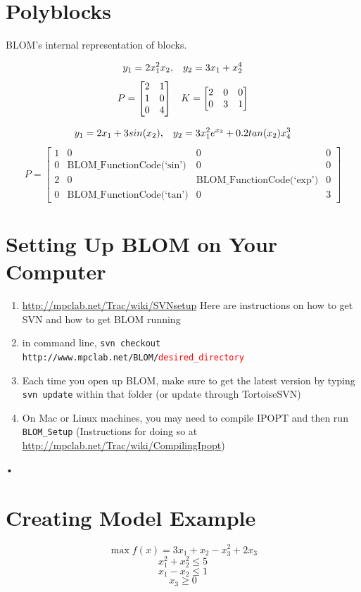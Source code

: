 \documentclass[12pt]{report}
\newcommand{\red}[1]{\textcolor{red}{#1}}
\begin{document}
\section{Polyblocks}
BLOM's internal representation of blocks.

$$ y_1=2x^2_1x_2 , \hspace{3mm} y_2=3x_1+x_2^4 $$
\[
P = \begin{bmatrix}
2 & 1 \\
1 & 0 \\
0 & 4
\end{bmatrix}
\hspace{3mm}
K = \begin{bmatrix}
2 & 0 & 0\\
0 & 3 & 1
\end{bmatrix}
\]

$$y_1 = 2x_1+3sin(x_2),  \hspace{3mm} y_2 = 3x_1^2e^{x_3}+0.2tan(x_2)x_4^3$$
\[P= \begin{bmatrix}
1 & 0 & 0 & 0 \\
0 & \text{BLOM\_FunctionCode(`sin')} & 0 & 0\\
2 & 0 & \text{BLOM\_FunctionCode(`exp')} & 0 \\
0 & \text{BLOM\_FunctionCode(`tan')} & 0 & 3
\end{bmatrix}
\]
\section{Setting Up BLOM on Your Computer}
\begin{enumerate}
\item \url{http://mpclab.net/Trac/wiki/SVNsetup} Here are instructions on how to get SVN and how to get BLOM running
\item in command line, \texttt{svn checkout http://www.mpclab.net/BLOM/\red{desired\_directory}}
\item Each time you open up BLOM, make sure to get the latest version by typing \texttt{svn update} within that folder (or update through TortoiseSVN)
\item On Mac or Linux machines, you may need to compile IPOPT and then run \texttt{BLOM\_Setup} (Instructions for doing so at \url{http://mpclab.net/Trac/wiki/CompilingIpopt})

\end{enumerate}•


\clearpage
\section{Creating Model Example}
\vspace{-20pt}$$\max  f(x)=3x_1+x_2-x_3^2+2x_3$$
$$x_1^2+x_2^2\leq5$$
$$x_1-x_2\leq1$$
$$x_3\geq0$$
\end{document}
